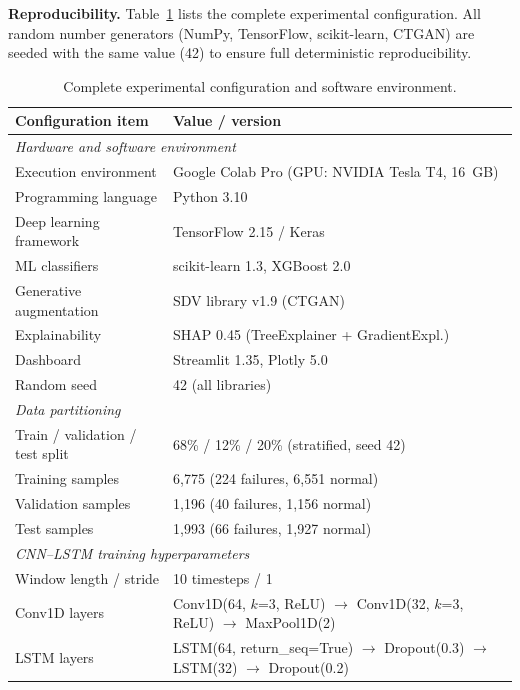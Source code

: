 \documentclass[sensors,article,submit,pdftex,moreauthors]{Definitions/mdpi}
\newcommand{\mdpitablefont}{\footnotesize}
\begin{document}
\textbf{Reproducibility.}
Table~\ref{tab:params} lists the complete experimental configuration.
All random number generators (NumPy, TensorFlow, scikit-learn, CTGAN)
are seeded with the same value (42) to ensure full deterministic
reproducibility.

\begin{table}[H]
\caption{Complete experimental configuration and software
environment.\label{tab:params}}
\centering
\mdpitablefont
\begin{tabularx}{\textwidth}{lX}
\toprule
\textbf{Configuration item} & \textbf{Value / version} \\
\midrule
\multicolumn{2}{l}{\textit{Hardware and software environment}} \\
Execution environment      & Google Colab Pro (GPU: NVIDIA Tesla T4, 16~GB) \\
Programming language       & Python 3.10 \\
Deep learning framework    & TensorFlow 2.15 / Keras \\
ML classifiers             & scikit-learn 1.3, XGBoost 2.0 \\
Generative augmentation    & SDV library v1.9 (CTGAN) \\
Explainability             & SHAP 0.45 (TreeExplainer + GradientExpl.) \\
Dashboard                  & Streamlit 1.35, Plotly 5.0 \\
Random seed                & 42 (all libraries) \\
\midrule
\multicolumn{2}{l}{\textit{Data partitioning}} \\
Train / validation / test split & 68\% / 12\% / 20\% (stratified, seed 42) \\
Training samples           & 6{,}775 (224 failures, 6{,}551 normal) \\
Validation samples         & 1{,}196 (40 failures, 1{,}156 normal) \\
Test samples               & 1{,}993 (66 failures, 1{,}927 normal) \\
\midrule
\multicolumn{2}{l}{\textit{CNN--LSTM training hyperparameters}} \\
Window length / stride     & 10 timesteps / 1 \\
Conv1D layers              & Conv1D(64, $k$=3, ReLU) $\to$ Conv1D(32, $k$=3, ReLU) $\to$ MaxPool1D(2) \\
LSTM layers                & LSTM(64, return\_seq=True) $\to$ Dropout(0.3) $\to$ LSTM(32) $\to$ Dropout(0.2) \\

\end{tabularx}
\end{table}
\end{document}

